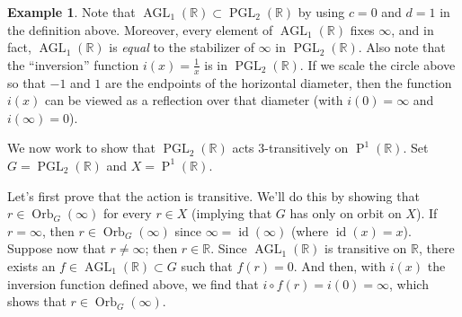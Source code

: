 \documentclass[11pt]{amsart}
\theoremstyle{plain}
\theoremstyle{definition}
\newtheorem{example}{Example}
\theoremstyle{remark}
\DeclareMathOperator{\AGL}{AGL}
\DeclareMathOperator{\PGL}{PGL}
\DeclareMathOperator{\Proj}{P}
\DeclareMathOperator{\id}{id}
\DeclareMathOperator{\Orb}{Orb}
\begin{document}
\begin{example}
Note that $\AGL_1(\mathbb{R}) \subset \PGL_2(\mathbb{R})$ by using $c=0$ and $d = 1$ in the definition above. Moreover, every element of $\AGL_1(\mathbb{R})$ fixes $\infty$, and in fact, $\AGL_1(\mathbb{R})$ is \emph{equal} to the stabilizer of $\infty$ in $\PGL_2(\mathbb{R})$. Also note that the ``inversion'' function $i(x) = \frac{1}{x}$ is in $\PGL_2(\mathbb{R})$. If we scale the circle above so that $-1$ and $1$ are the endpoints of the horizontal diameter, then the function $i(x)$ can be viewed as a reflection over that diameter (with $i(0) = \infty$ and $i(\infty) = 0$). 

\begin{center}
\end{center}

We now work to show that $\PGL_2(\mathbb{R})$ acts $3$-transitively on $\Proj^1(\mathbb{R})$. Set $G = \PGL_2(\mathbb{R})$ and $X = \Proj^1(\mathbb{R})$. 

Let's first prove that the action is transitive.  We'll do this by showing that $r\in \Orb_G(\infty)$ for every $r\in X$ (implying that $G$ has only on orbit on $X$). If $r=\infty$, then $r\in \Orb_G(\infty)$ since $\infty = \id(\infty)$ (where $\id(x) = x$). Suppose now that $r\neq\infty$; then $r\in \mathbb{R}$. Since $\AGL_1(\mathbb{R})$ is transitive on $\mathbb{R}$, there exists an $f\in \AGL_1(\mathbb{R}) \subset G$ such that $f(r) = 0$. And then, with $i(x)$ the inversion function defined above, we find that $i\circ f(r) = i(0) = \infty$, which shows that $r\in \Orb_G(\infty)$.


\end{example}
\end{document}
